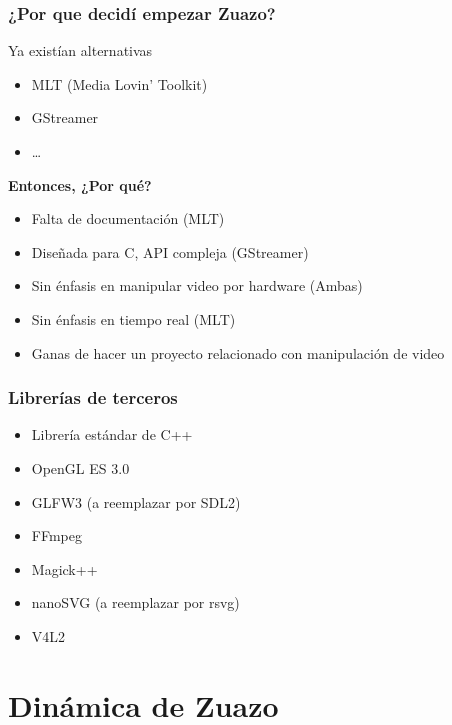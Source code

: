 \documentclass{beamer}
\begin{document}
\begin{frame} \frametitle{¿Por que decidí empezar Zuazo?}
	\begin{block}{Ya existían alternativas}
		\begin{itemize}
			\item{MLT (Media Lovin' Toolkit)}
			\item{GStreamer}
			\item{\ldots}
		\end{itemize}
	\end{block}
	\textbf{Entonces, ¿Por qué?}
	\begin{itemize}
		\item{Falta de documentación (MLT)}
		\item{Diseñada para C, API compleja (GStreamer)}
		\item{Sin énfasis en manipular video por hardware (Ambas)} 
		\item{Sin énfasis en tiempo real (MLT)} 
		\item{Ganas de hacer un proyecto relacionado con manipulación de video}
	\end{itemize}
\end{frame}

\begin{frame} \frametitle{Librerías de terceros}
	\begin{itemize}
		\item{Librería estándar de C++}
		\item{OpenGL ES 3.0}
		\item{GLFW3 (a reemplazar por SDL2)}
		\item{FFmpeg}
		\item{Magick++}
		\item{nanoSVG (a reemplazar por rsvg)}
		\item{V4L2}
	\end{itemize}
\end{frame}


%
%
\section{Dinámica de Zuazo}
\end{document}
